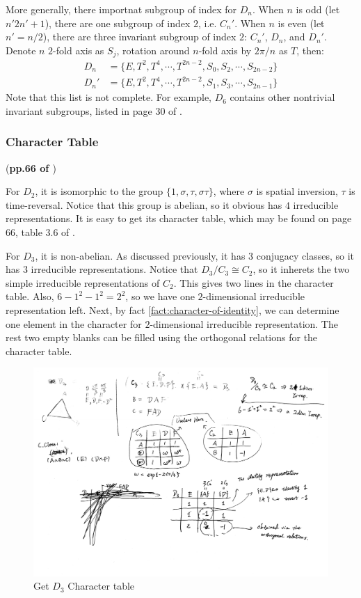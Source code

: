 More generally, there importnat subgroup of index for $D_n$. When $n$
is odd (let $n'2n'+1$), there are one subgroup of index $2$, i.e.
$C_n'$. When $n$ is even (let $n'=n/2$), there are three invariant
subgroup of index $2$: $C_n'$, $D_n$, and $D_n'$. Denote $n$ $2$-fold
axis as $S_j$, rotation around $n$-fold axis by $2\pi/n$ as $T$,
then:
\begin{align}
    D_n &= \{E, T^2,T^4,\cdots,T^{2n-2},S_0,S_2,\cdots,S_{2n-2}\} \\
    D_n' &= \{E, T^2,T^4,\cdots,T^{2n-2},S_1,S_3,\cdots,S_{2n-1}\}
\end{align}
Note that this list is not complete. For example, $D_6$ contains other
nontrivial invariant subgroups, listed in page 30 of \cite{book}.

\subsubsection{Character Table} (\textbf{pp.66 of \cite{book}})

For $D_2$, it is isomorphic to the group
$\{1,\sigma,\tau,\sigma\tau\}$, where $\sigma$ is spatial inversion,
$\tau$ is time-reversal. Notice that this group is abelian, so it
obvious has $4$ irreducible representations. It is easy to get its
character table, which may be found on page 66, table 3.6 of
\cite{book}.

For $D_3$, it is non-abelian. As discussed previously, it has $3$
conjugacy classes, so it has 3 irreducible representations. Notice
that $D_3/C_3 \cong C_2$, so it inherets the two simple irreducible
representations of $C_2$. This gives two lines in the character
table. Also, $6-1^2-1^2=2^2$, so we have one $2$-dimensional
irreducible representation left.  Next, by fact
\ref{fact:character-of-identity}, we can determine one element in the
character for $2$-dimensional irreducible representation. The rest two
empty blanks can be filled using the orthogonal relations for the
character table.
\begin{figure}[H]
    \centering
    \includegraphics[width=0.8\linewidth]{scans/get-D3-character.pdf}
    \caption{Get $D_3$ Character table}
\end{figure}

